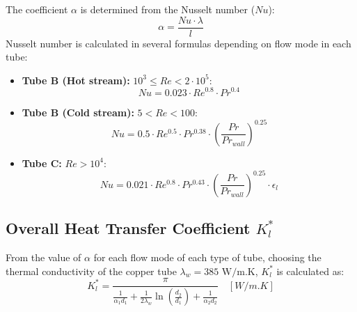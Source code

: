 The coefficient $\alpha$ is determined from the Nusselt number ($Nu$):
\begin{equation}
    \alpha = \frac{Nu \cdot \lambda}{l}
\end{equation}
Nusselt number is calculated in several formulas depending on flow mode in each tube:
\begin{itemize}
    \item \textbf{Tube B (Hot stream):} $10^3 \le Re < 2 \cdot 10^5$:
    \begin{equation}
        Nu = 0.023 \cdot Re^{0.8} \cdot Pr^{0.4}
    \end{equation}
    \item \textbf{Tube B (Cold stream):} $5 < Re < 100$:
    \begin{equation}
        Nu = 0.5 \cdot Re^{0.5} \cdot Pr^{0.38} \cdot \left(\frac{Pr}{Pr_{wall}}\right)^{0.25}
    \end{equation}
    \item \textbf{Tube C:} $Re > 10^4$:
    \begin{equation}
        Nu = 0.021 \cdot Re^{0.8} \cdot Pr^{0.43} \cdot \left(\frac{Pr}{Pr_{wall}}\right)^{0.25} \cdot \epsilon_l
    \end{equation}
\end{itemize}

\subsection{Overall Heat Transfer Coefficient $K_l^*$}\label{overall-k-star}

From the value of $\alpha$ for each flow mode of each type of tube, choosing the thermal conductivity of the copper tube $\lambda_w = 385 \text{ W/m.K}$, $K_l^*$ is calculated as:
\begin{equation}
    K_l^* = \frac{\pi}{\frac{1}{\alpha_1 d_1} + \frac{1}{2\lambda_w} \ln\left(\frac{d_2}{d_1}\right) + \frac{1}{\alpha_2 d_{2}}} \quad [W/m.K]
\end{equation}
